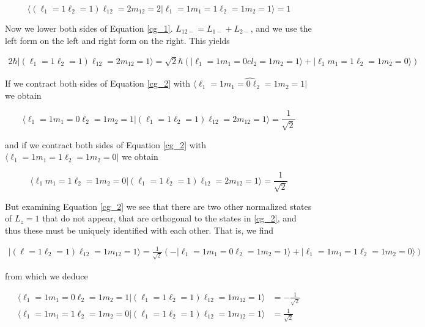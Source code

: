 \[
\langle ( \ell_1 = 1 \ell_2=1 ) \ell_{12} = 2 m_{12} = 2 | \ell_1 = 1 m_1
= 1 \ell_2 = 1 m_2 = 1 \rangle = 1
\] \vspace{3px}

Now we lower both sides of Equation \ref{cg_1}. $L_{12-} = L_{1-} + L_{2-}$,
and we use the left form on the left and right form on the right. This yields 

\begin{align} \label{cg_2}
  2\hbar |(\ell_1 = 1 \ell_2 = 1) \ell_{12} = 2 m_{12} = 1 \rangle
  = \sqrt{2}\hbar (|\ell_1 = 1 m_1 = 0 el_2 = 1 m_2 = 1\rangle + |\ell_1 m_1
  = 1\ell_2 = 1 m_2 = 0 \rangle )
\end{align}\vspace{3px}

If we contract both sides of Equation \ref{cg_2} with $\hat{\langle \ell_1
= 1 m_1 = 0 \ell_2 = 1 m_2 = 1|}$ we obtain 

\[
\langle \ell_1 = 1 m_1 = 0 \ell_2 = 1 m_2 = 1 | (\ell_1 = 1 \ell_2 = 1)
\ell_{12} = 2 m_{12} = 1 \rangle = \frac{1}{\sqrt{2}}
\] \vspace{3px}

and if we contract both sides of Equation \ref{cg_2} with $\langle \ell_1
= 1 m_1 = 1 \ell_2 = 1 m_2 = 0|$ we obtain 

\[
\langle \ell_1 m_1 = 1 \ell_2 = 1 m_2 = 0 | (\ell_1 = 1 \ell_2 = 1 ) \ell_{12}
= 2 m_{12} = 1 \rangle = \frac{1}{\sqrt{2}}
\] \vspace{3px}

But examining Equation \ref{cg_2} we see that there are two other normalized
states of $L_z = 1$ that do not appear, that are orthogonal to the states in
\ref{cg_2}, and thus these must be uniquely identified with each other. That
is, we find 

\begin{align} \label{cg_3}
|(\ell = 1 \ell_2 = 1)\ell_{12} = 1 m_{12} = 1 \rangle = \frac{1}{\sqrt{2}}
( - |\ell_1 = 1 m_1 = 0 \ell_2 = 1 m_2 = 1 \rangle + |\ell_1 = 1 m_1 = 1 \ell_2
= 1 m_2 = 0 \rangle ) 
\end{align} \vspace{3px}

from which we deduce

\begin{align} \label{}
  \langle \ell_1 = 1 m_1 = 0 \ell_2 = 1 m_2 = 1 | (\ell_1 = 1 \ell_2
  = 1 ) \ell_{12} = 1 m_{12} = 1 \rangle &= -\frac{1}{\sqrt{2}} \\ 
  \langle \ell_1 = 1 m_1 = 1 \ell_2 = 1 m_2 = 0 | (\ell_1 =1 \ell_2 = 1)
  \ell_{12} = 1 m_{12} = 1 \rangle &= \frac{1}{\sqrt{2}}
\end{align}\vspace{3px}

